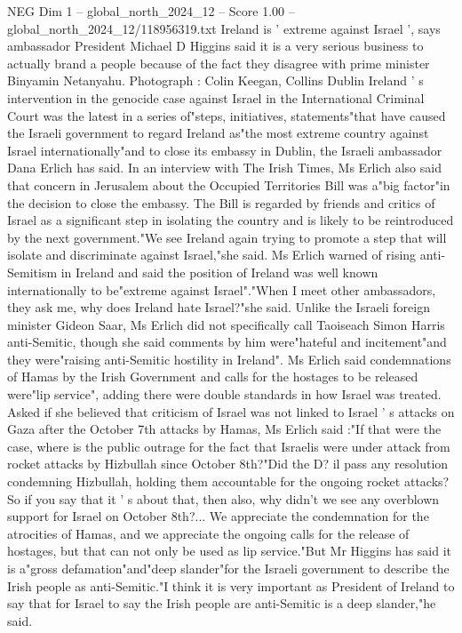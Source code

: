\begin{textsample}{NEG Dim 1 – global\_north\_2024\_12 – Score 1.00 – global\_north\_2024\_12/118956319.txt}  \label{ex:f1_neg_223}
Ireland is ' extreme against Israel ', says ambassador President Michael D Higgins said it is a very serious business to actually brand a people because of the fact they disagree with prime minister Binyamin Netanyahu.
Photograph : Colin Keegan, Collins Dublin Ireland ' s intervention in the genocide case against Israel in the International Criminal Court was the latest in a series of"steps, initiatives, statements"that have caused the Israeli government to regard Ireland as"the most extreme country against Israel internationally"and to close its embassy in Dublin, the Israeli ambassador Dana Erlich has said.
In an interview with The Irish Times, Ms Erlich also said that concern in Jerusalem about the Occupied Territories Bill was a"big factor"in the decision to close the embassy.
The Bill is regarded by friends and critics of Israel as a significant step in isolating the country and is likely to be reintroduced by the next government."We see Ireland again trying to promote a step that will isolate and discriminate against Israel,"she said.
Ms Erlich warned of rising anti-Semitism in Ireland and said the position of Ireland was well known internationally to be"extreme against Israel"."When I meet other ambassadors, they ask me, why does Ireland hate Israel?"she said.
Unlike the Israeli foreign minister Gideon Saar, Ms Erlich did not specifically call Taoiseach Simon Harris anti-Semitic, though she said comments by him were"hateful and incitement"and they were"raising anti-Semitic hostility in Ireland".
Ms Erlich said condemnations of Hamas by the Irish Government and calls for the hostages to be released were"lip service", adding there were double standards in how Israel was treated.
Asked if she believed that criticism of Israel was not linked to Israel ' s attacks on Gaza after the October 7th attacks by Hamas, Ms Erlich said :"If that were the case, where is the public outrage for the fact that Israelis were under attack from rocket attacks by Hizbullah since October 8th?"Did the D? il pass any resolution condemning Hizbullah, holding them accountable for the ongoing rocket attacks?
So if you say that it ' s about that, then also, why didn't we see any overblown support for Israel on October 8th?...
We appreciate the condemnation for the atrocities of Hamas, and we appreciate the ongoing calls for the release of hostages, but that can not only be used as lip service."But Mr Higgins has said it is a"gross defamation"and"deep slander"for the Israeli government to describe the Irish people as anti-Semitic."I think it is very important as President of Ireland to say that for Israel to say the Irish people are anti-Semitic is a deep slander,"he said.

\end{textsample}
